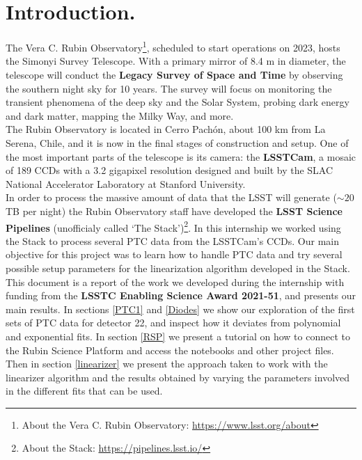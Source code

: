\section{Introduction.}

\noindent The Vera C. Rubin Observatory\footnote{About the Vera C. Rubin Observatory: \url{https://www.lsst.org/about}}, scheduled to start operations on 2023, hosts the Simonyi Survey Telescope. With a primary mirror of 8.4 m in diameter, the telescope will conduct the \textbf{Legacy Survey of Space and Time} by observing the southern night sky for 10 years. The survey will focus on monitoring the transient phenomena of the deep sky and the Solar System, probing dark energy and dark matter, mapping the Milky Way, and more.\\

\noindent The Rubin Observatory is located in Cerro Pachón, about 100 km from La Serena, Chile, and it is now in the final stages of construction and setup. One of the most important parts of the telescope is its camera: the \textbf{LSSTCam}, a mosaic of 189 CCDs with a 3.2 gigapixel resolution designed and built by the SLAC National Accelerator Laboratory at Stanford University.\\

\noindent In order to process the massive amount of data that the LSST will generate ($\sim 20$ TB per night) the Rubin Observatory staff have developed the \textbf{LSST Science Pipelines} (unofficialy called `The Stack')\footnote{About the Stack: \url{https://pipelines.lsst.io/}}. In this internship we worked using the Stack to process several PTC data from the LSSTCam's CCDs. Our main objective for this project was to learn how to handle PTC data and try several possible setup parameters for the linearization algorithm developed in the Stack. \\

\noindent This document is a report of the work we developed during the internship with funding from the \textbf{LSSTC Enabling Science Award 2021-51}, and presents our main results. In sections \ref{PTC1} and \ref{Diodes} we show our exploration of the first sets of PTC data for detector 22, and inspect how it deviates from polynomial and exponential fits. In section \ref{RSP} we present a tutorial on how to connect to the Rubin Science Platform and access the notebooks and other project files. Then in section \ref{linearizer} we present the approach taken to work with the linearizer algorithm and the results obtained by varying the parameters involved in the different fits that can be used.\\

